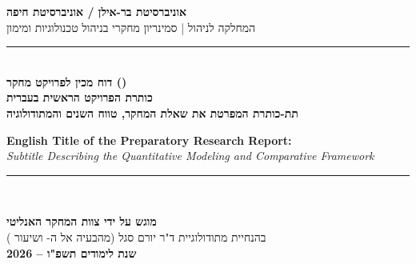 \documentclass[12pt,a4paper,oneside]{book}
\begin{document}
\frontmatter

\begin{titlepage}
\thispagestyle{empty}

\begin{center}
  \vspace*{0.8cm}
  {\Large\hebrewfontsf\bfseries\color{BrandBlue} אוניברסיטת בר-אילן / אוניברסיטת חיפה}\\[0.25cm]
  {\large\hebrewfontsf\color{BrandNavy} המחלקה לניהול | סמינריון מחקרי בניהול טכנולוגיות ומימון}\\[0.6cm]
  {\color{BrandGold}\rule{0.75\textwidth}{1.2pt}}\\[0.7cm]

  {\large\hebrewfontsf\bfseries\color{BrandTeal} דוח מכין לפרויקט מחקר ()}\\[0.5cm]

  {\Huge\hebrewfontsf\bfseries\color{BrandNavy} כותרת הפרויקט הראשית בעברית}\\[0.35cm]
  {\Large\hebrewfontsf\bfseries\color{BrandBlue} תת-כותרת המפרטת את שאלת המחקר, טווח השנים והמתודולוגיה}\\[0.5cm]

  \begin{english}
  {\large\bfseries\color{BrandNavy} English Title of the Preparatory Research Report:}\\[0.15cm]
  {\normalsize\itshape\color{BrandBlue} Subtitle Describing the Quantitative Modeling and Comparative Framework}
  \end{english}

  \vspace{0.6cm}
  {\color{BrandGold}\rule{0.75\textwidth}{1.2pt}}\\[0.8cm]
\end{center}

\vfill
\begin{center}
  {\normalsize\hebrewfontsf\bfseries\color{BrandNavy} מוגש על ידי צוות המחקר האנליטי}\\[0.2cm]
  {\normalsize\hebrewfontsf\color{BrandBlue} בהנחיית מתודולוגיית ד"ר יורם סגל (מהבעיה אל ה- ושיעור )}\\[0.35cm]
  {\normalsize\hebrewfontsf\bfseries\color{BrandNavy} שנת לימודים תשפ"ו -- \num{2026}}
\end{center}
\vspace*{0.6cm}
\end{titlepage}
\end{document}
